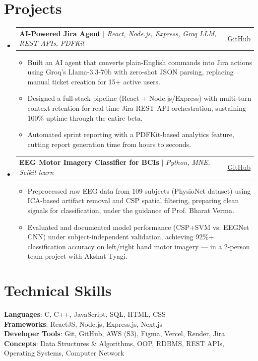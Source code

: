 \documentclass[letterpaper,11pt]{article}
\makeatletter
\newcommand{\resumeItem}[1]{
  \item\small{
    {#1 \vspace{-2pt}}
  }
}
\newcommand{\resumeProjectHeading}[2]{
    \item
    \begin{tabular*}{0.97\textwidth}{l@{\extracolsep{\fill}}r}
      \small#1 & #2 \\
    \end{tabular*}\vspace{-7pt}
}
\newcommand{\resumeSubHeadingListStart}{\begin{itemize}[leftmargin=0.15in, label={}]}
\newcommand{\resumeSubHeadingListEnd}{\end{itemize}}
\newcommand{\resumeItemListStart}{\begin{itemize}}
\newcommand{\resumeItemListEnd}{\end{itemize}\vspace{-5pt}}
\makeatother
\begin{document}
\section{Projects}
    \resumeSubHeadingListStart
          \resumeProjectHeading
    {\textbf{AI-Powered Jira Agent} $|$ \emph{React, Node.js, Express, Groq LLM, REST APIs, PDFKit}}{\href{https://github.com/ARSOULGOD/JIRA-PROJECT.git}{\underline{GitHub}}}
    \resumeItemListStart
      \resumeItem{Built an AI agent that converts plain-English commands into Jira actions using Groq's Llama-3.3-70b with zero-shot JSON parsing, replacing manual ticket creation for 15+ active users.}
      \resumeItem{Designed a full-stack pipeline (React + Node.js/Express) with multi-turn context retention for real-time Jira REST API orchestration, sustaining 100\% uptime through the entire beta.}
      \resumeItem{Automated sprint reporting with a PDFKit-based analytics feature, cutting report generation time from hours to seconds.}
   
          \resumeItemListEnd
      \resumeProjectHeading
          {\textbf{EEG Motor Imagery Classifier for BCIs} $|$ \emph{Python, MNE, Scikit-learn}}{\href{https://github.com/ARSOULGOD/EEG-Motor-Imagery-Classification.git}{\underline{GitHub}}}
          \resumeItemListStart
             \resumeItem{Preprocessed raw EEG data from 109 subjects (PhysioNet dataset) using ICA-based artifact removal and CSP spatial filtering, preparing clean signals for classification, under the guidance of Prof. Bharat Verma.}
      \resumeItem{Evaluated and documented model performance (CSP+SVM vs. EEGNet CNN) under subject-independent validation, achieving 92\%+ classification accuracy on left/right hand motor imagery — in a 2-person team project with Akshat Tyagi.}
    \resumeItemListEnd
    \resumeSubHeadingListEnd

%
\section{Technical Skills}
 \begin{itemize}[leftmargin=0.15in, label={}]
    \small{\item{
     \textbf{Languages}{: C, C++, JavaScript, SQL, HTML, CSS} \\
     \textbf{Frameworks}{: ReactJS, Node.js, Express.js, Next.js} \\
     \textbf{Developer Tools}{: Git, GitHub, AWS (S3), Figma, Vercel, Render, Jira} \\
     \textbf{Concepts}{: Data Structures \& Algorithms, OOP, RDBMS, REST APIs, Operating Systems, Computer Network}
    }}
 \end{itemize}
\end{document}
